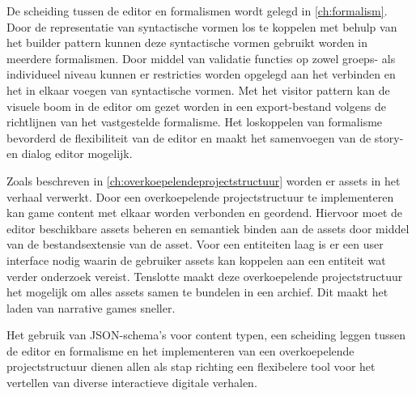 De scheiding tussen de editor en formalismen wordt gelegd in \autoref{ch:formalism}. Door de representatie van syntactische vormen los te koppelen met behulp van het builder pattern kunnen deze syntactische vormen gebruikt worden in meerdere formalismen. Door middel van validatie functies op zowel groeps- als individueel niveau kunnen er restricties worden opgelegd aan het verbinden en het in elkaar voegen van syntactische vormen. Met het visitor pattern kan de visuele boom in de editor om gezet worden in een export-bestand volgens de richtlijnen van het vastgestelde formalisme. Het loskoppelen van formalisme bevorderd de flexibiliteit van de editor en maakt het samenvoegen van de story- en dialog editor mogelijk.

Zoals beschreven in \autoref{ch:overkoepelendeprojectstructuur} worden er assets in het verhaal verwerkt. Door een overkoepelende projectstructuur te implementeren kan game content met elkaar worden verbonden en geordend. Hiervoor moet de editor beschikbare assets beheren en semantiek binden aan de assets door middel van de bestandsextensie van de asset. Voor een entiteiten laag is er een user interface nodig waarin de gebruiker assets kan koppelen aan een entiteit wat verder onderzoek vereist. Tenslotte maakt deze overkoepelende projectstructuur het mogelijk om alles assets samen te bundelen in een archief. Dit maakt het laden van narrative games sneller.

Het gebruik van JSON-schema’s voor content typen, een scheiding leggen tussen de editor en formalisme en het implementeren van een overkoepelende projectstructuur dienen allen als stap richting een flexibelere tool voor het vertellen van diverse interactieve digitale verhalen.
